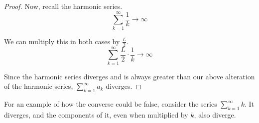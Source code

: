 \documentclass[12pt]{report}
\begin{document}
\begin{proof}
            Now, recall the harmonic series.
            \begin{equation}
                \sum_{k=1}^{\infty} \frac{1}{k} \to \infty
            \end{equation}
    
            We can multiply this in both cases by $\frac{L}{2}$.
            \begin{equation}
                \sum_{k=1}^{\infty} \frac{L}{2} \cdot \frac{1}{k} \to \infty
            \end{equation}
            
            Since the harmonic series diverges and  is always greater than our above alteration of the harmonic series, $\sum_{k = 1}^{\infty} a_k$ diverges.
        \end{proof}

        For an example of how the converse could be false, consider the series $\sum_{k = 1}^{\infty} k$.
        It diverges, and the components of it, even when multiplied by $k$, also diverge.
    
\end{document}
